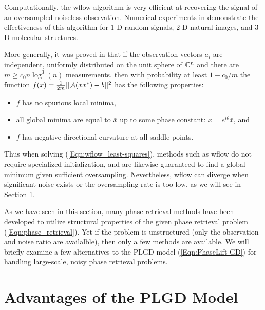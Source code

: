 Computationally, the wflow algorithm is very efficient at recovering the signal of an oversampled noiseless observation.  Numerical experiments in \cite[Section 4]{DBLP:journals/tit/CandesLS15} demonstrate the effectiveness of this algorithm for $1$-D random signals, $2$-D natural images, and $3$-D molecular structures.  


More generally, it was proved in \cite{sun2016geometric} that if the observation vectors $a_i$ are independent, uniformly distributed on the unit sphere of ${\mathbb C}^n$ and there are $m \geq c_0 n \log^3(n)$ measurements, then with probability at least $1-c_0/m$ the function $f(x) = \frac{1}{2m}||{\mathcal A}(xx^*) - b||^2$ has the following properties:

\begin{itemize} 		

\item 
$f$ has no spurious local minima,

\item
all global minima are equal to $\bar{x}$ up to some phase constant: $x = e^{i \theta}\bar{x}$, and

\item
$f$ has negative directional curvature at all saddle points.

\end{itemize}

Thus when solving (\ref{Eqn:wflow_least-squares}), methods such as wflow do not require specialized initialization, and are likewise guaranteed to find a global minimum given sufficient oversampling.  Nevertheless, wflow can diverge when significant noise exists or the oversampling rate is too low, as we will see in Section \ref{Subsec:phase_retrieval-why_optimize_PLGD_model}.


As we have seen in this section, many phase retrieval methods have been developed to utilize structural properties of the given phase retrieval problem (\ref{Eqn:phase_retrieval}).  
Yet if the problem is unstructured (only the observation and noise ratio are availalble), then only a few methods are available.   
We will briefly examine a few alternatives to the PLGD model (\ref{Eqn:PhaseLift-GD}) for handling large-scale, noisy phase retrieval problems.




\section{Advantages of the PLGD Model}		\label{Subsec:phase_retrieval-why_optimize_PLGD_model}




